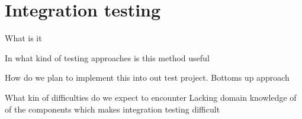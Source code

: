 \section{Integration testing}


What is it
	

In what kind of testing approaches is this method useful

How do we plan to implement this into out test project.
	Bottoms up approach 

What kin of difficulties  do we expect to encounter
	Lacking domain knowledge of of the components which makes integration testing difficult
	